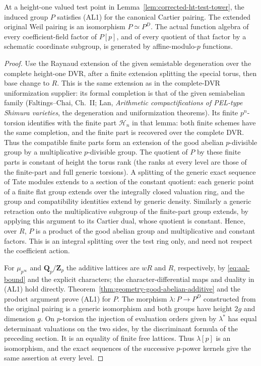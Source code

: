 \begin{corollary}
\label{cor:geometry-induced-additive}
At a height-one valued test point in
Lemma~\ref{lem:corrected-ht-test-tower}, the induced group \(P\)
satisfies (AL1) for the canonical Cartier pairing. The extended
original Weil pairing is an isomorphism \(P\simeq P^D\).
The actual function algebra of every coefficient-field
factor of \(P[p]\), and of every quotient of that factor by
a schematic coordinate subgroup, is generated by
affine-modulo-\(p\) functions.
\end{corollary}
\begin{proof}
Use the Raynaud extension of the given semistable degeneration
over the complete height-one DVR, after a finite extension
splitting the special torus, then base change to \(R\).
This is the same extension as in the complete-DVR
uniformization supplier: its formal completion is that of
the given semiabelian family (Faltings--Chai, Ch.~II;
Lan, \emph{Arithmetic compactifications of PEL-type Shimura
varieties}, the degeneration and uniformization theorems).
Its finite \(p^n\)-torsion identifies with the finite part
\(\mathcal H_n\) in that lemma: both finite schemes have the
same completion, and the finite part is recovered over the
complete DVR. Thus the compatible finite parts form an
extension of the good abelian \(p\)-divisible group by a
multiplicative \(p\)-divisible group.
The quotient of \(P\) by these finite parts is constant of
height the torus rank (the ranks at every level are those
of the finite-part and full generic torsions). A splitting
of the generic exact sequence of Tate modules extends to
a section of the constant quotient: each generic point of
a finite flat group extends over the integrally closed
valuation ring, and the group and compatibility identities
extend by generic density. Similarly a generic retraction
onto the multiplicative subgroup of the finite-part group
extends, by applying this argument to its Cartier dual,
whose quotient is constant. Hence, over \(R\), \(P\)
is a product of the good abelian group and multiplicative
and constant factors. This is an integral splitting over the
test ring only, and need not respect the coefficient action.

For \(\mu_{p^\infty}\) and \(\mathbf Q_p/\mathbf Z_p\) the
additive lattices are \(wR\) and \(R\), respectively, by
\eqref{eq:aal-bound} and the explicit characters; the
character-differential maps and duality in (AL1) hold directly.
Theorem~\ref{thm:geometry-good-abelian-additive} and the
product argument prove (AL1) for \(P\).
The morphism \(\lambda:P\to P^D\) constructed from the
original pairing is a generic isomorphism and both groups
have height \(2g\) and dimension \(g\).
On \(p\)-torsion the injection of evaluation orders given by
\(\lambda^*\) has equal determinant valuations on the two
sides, by the discriminant formula of the preceding section.
It is an equality of finite free lattices. Thus \(\lambda[p]\)
is an isomorphism, and the exact sequences of the successive
\(p\)-power kernels give the same assertion at every level.


\end{proof}
